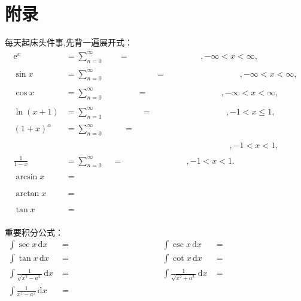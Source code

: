 \section{附录}
每天起床头件事,先背一遍展开式：
\begin{align*}
    \mathrm{e}^x&=\sum^{\infty}_{n=0}\phantom{\frac{1}{n!}x^n}=\phantom{1+x+\frac{x^2}{2!}+\frac{x^3}{3!}+\dots},-\infty<x<\infty,\\
    \sin x&=\sum^{\infty}_{n=0}\phantom{\frac{(-1)^n}{(2n+1)!}x^{2n+1}}=\phantom{x-\frac{x^3}{3!}+\frac{x^5}{5!}-\frac{x^7}{7!}+\dots},-\infty<x<\infty,\\
    \cos x&=\sum^{\infty}_{n=0}\phantom{\frac{(-1)^n}{(2n)!}x^{2n}}=\phantom{1-\frac{x^2}{2!}+\frac{x^4}{4!}-\frac{x^6}{6!}+\dots},-\infty<x<\infty,\\
    \ln(x+1)&=\sum^{\infty}_{n=1}\phantom{\frac{(-1)^{n-1}}{n}x^n}=\phantom{x-\frac{x^2}{2}+\frac{x^3}{3}-\frac{x^4}{4}+\dots},-1<x\leqslant 1,\\
    (1+x)^\alpha&=\sum^{\infty}_{n=0}\phantom{\mathbf{C} _\alpha^nx^n}=\phantom{1+\alpha x+\frac{\alpha(\alpha-1)}{2!}x^2+}\\
    &\phantom{\phantom{=\sum^{\infty}_{n=0}\mathbf{C} _\alpha^nx^n=}\dots+\frac{\alpha(\alpha-1)\dots(\alpha-n+1)}{n!}x^n},-1<x<1,\\
    \frac{1}{1-x}&=\sum^{\infty}_{n=0}\phantom{x^n}=\phantom{1+x+x^2+x^3\dots},-1<x<1.\\
    \arcsin x &= \phantom{x +\frac{x^3}{3!}+o(x^3) }\\
    \arctan x &= \phantom{x -\frac{x^3}{3}+o(x^3)} \\
    \tan x &= \phantom{x+\frac{x^3}{3}+o(x^3)}
\end{align*}

重要积分公式：
\begin{align*}
    \int\sec x\,\mathrm{d}x &=\phantom{\ln \left\lvert \sec x+\tan x\right\rvert +C}&
    \int\csc x\,\mathrm{d}x &=\phantom{\ln \left\lvert \csc x-\cot x\right\rvert +C}\\
    \int\tan x\,\mathrm{d}x &=\phantom{-\ln \left\lvert \cos x\right\rvert +C}&
    \int\cot x\,\mathrm{d}x &=\phantom{\ln \left\lvert \sin x\right\rvert +C}\\
    \int\frac{1}{\sqrt{x^2-a^2}}\,\mathrm{d}x &=\phantom{\ln \left\lvert x+\sqrt{x^2-a^2}\right\rvert +C}&
    \int\frac{1}{\sqrt{x^2+a^2}}  \,\mathrm{d}x&=\phantom{\ln \left\lvert x+\sqrt{x^2+a^2}\right\rvert \,\mathrm{d}x} \\
    \int \frac{1}{x^2-a^2} \,\mathrm{d}x &=\phantom{\frac{1}{2a}\ln \left\lvert \frac{x-a}{x+a}\right\rvert +C}
\end{align*}


